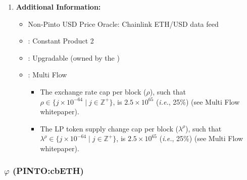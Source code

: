 \documentclass[class=article, crop=false]{standalone}
\begin{document}
\begin{enumerate}
    \item \textbf{Additional Information:}
        \begin{itemize}
            \item Non-Pinto USD Price Oracle: Chainlink ETH/USD data feed
            \item {}: Constant Product 2
            \item {}: Upgradable  (owned by the )
            \item {}: Multi Flow
                \begin{itemize}
                    \item The exchange rate cap per block ($\rho$), such that $\rho \in \{j \times 10^{-64} \mid j \in \mathbb{Z}^{+} \}$, is $2.5 \times 10^{65}$ (\textit{i.e.}, 25\%) (see Multi Flow whitepaper).
                    \item The LP token supply change cap per block ($\lambda^{\rho}$), such that $\lambda^{\rho} \in \{j \times 10^{-64} \mid j \in \mathbb{Z}^{+} \}$, is $2.5 \times 10^{65}$ (\textit{i.e.}, 25\%) (see Multi Flow whitepaper).
                \end{itemize}
        \end{itemize}

\end{enumerate}


\subsubsection{$\varphi$ (PINTO:cbETH)}
\end{document}
